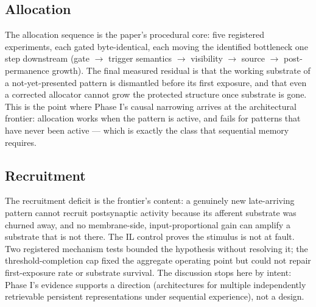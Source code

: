 \subsection{Allocation}

The allocation sequence is the paper's procedural core: five
registered experiments, each gated byte-identical, each moving the
identified bottleneck one step downstream (gate \(\to\) trigger
semantics \(\to\) visibility \(\to\) source \(\to\) post-permanence
growth). The final measured residual is that the working substrate of a
not-yet-presented pattern is dismantled before its first exposure, and
that even a corrected allocator cannot grow the protected structure
once substrate is gone. This is the point where Phase I's causal
narrowing arrives at the architectural frontier: allocation works when
the pattern is active, and fails for patterns that have never been
active --- which is exactly the class that sequential memory requires.

\subsection{Recruitment}

The recruitment deficit is the frontier's content: a genuinely new
late-arriving pattern cannot recruit postsynaptic activity because its
afferent substrate was churned away, and no membrane-side,
input-proportional gain can amplify a substrate that is not there. The
IL control proves the stimulus is not at fault. Two registered
mechanism tests bounded the hypothesis without resolving it; the
threshold-completion cap fixed the aggregate operating point but could
not repair first-exposure rate or substrate survival. The discussion
stops here by intent: Phase I's evidence supports a direction
(architectures for multiple independently retrievable persistent
representations under sequential experience), not a design.
